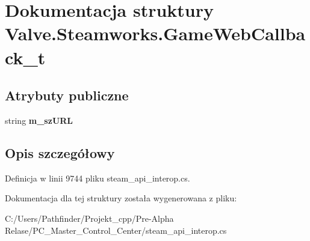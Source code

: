 \hypertarget{struct_valve_1_1_steamworks_1_1_game_web_callback__t}{}\section{Dokumentacja struktury Valve.\+Steamworks.\+Game\+Web\+Callback\+\_\+t}
\label{struct_valve_1_1_steamworks_1_1_game_web_callback__t}
\subsection*{Atrybuty publiczne}
\begin{DoxyCompactItemize}
\item 
\mbox{\label{struct_valve_1_1_steamworks_1_1_game_web_callback__t_a56662d6f36626a4e31e8671b26bd7e81}} 
string {\bfseries m\+\_\+sz\+U\+RL}
\end{DoxyCompactItemize}


\subsection{Opis szczegółowy}


Definicja w linii 9744 pliku steam\+\_\+api\+\_\+interop.\+cs.



Dokumentacja dla tej struktury została wygenerowana z pliku\+:\begin{DoxyCompactItemize}
\item 
C\+:/\+Users/\+Pathfinder/\+Projekt\+\_\+cpp/\+Pre-\/\+Alpha Relase/\+P\+C\+\_\+\+Master\+\_\+\+Control\+\_\+\+Center/steam\+\_\+api\+\_\+interop.\+cs\end{DoxyCompactItemize}
